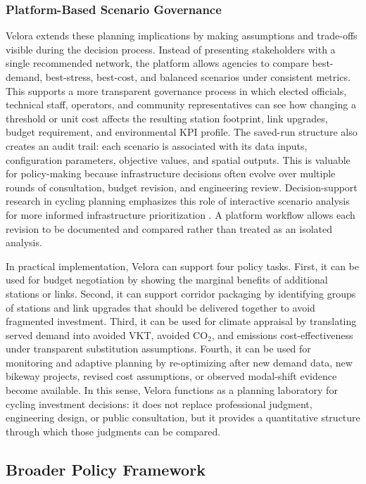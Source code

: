 \documentclass[preprint,authoryear,10pt]{elsarticle}
\begin{document}
\subsubsection{Platform-Based Scenario Governance}

Velora extends these planning implications by making assumptions and trade-offs visible during the decision process. Instead of presenting stakeholders with a single recommended network, the platform allows agencies to compare best-demand, best-stress, best-cost, and balanced scenarios under consistent metrics. This supports a more transparent governance process in which elected officials, technical staff, operators, and community representatives can see how changing a threshold or unit cost affects the resulting station footprint, link upgrades, budget requirement, and environmental KPI profile. The saved-run structure also creates an audit trail: each scenario is associated with its data inputs, configuration parameters, objective values, and spatial outputs. This is valuable for policy-making because infrastructure decisions often evolve over multiple rounds of consultation, budget revision, and engineering review. Decision-support research in cycling planning emphasizes this role of interactive scenario analysis for more informed infrastructure prioritization \citep{silvestriCyclabilityDSS2024}. A platform workflow allows each revision to be documented and compared rather than treated as an isolated analysis.

In practical implementation, Velora can support four policy tasks. First, it can be used for budget negotiation by showing the marginal benefits of additional stations or links. Second, it can support corridor packaging by identifying groups of stations and link upgrades that should be delivered together to avoid fragmented investment. Third, it can be used for climate appraisal by translating served demand into avoided VKT, avoided CO$_2$, and emissions cost-effectiveness under transparent substitution assumptions. Fourth, it can be used for monitoring and adaptive planning by re-optimizing after new demand data, new bikeway projects, revised cost assumptions, or observed modal-shift evidence become available. In this sense, Velora functions as a planning laboratory for cycling investment decisions: it does not replace professional judgment, engineering design, or public consultation, but it provides a quantitative structure through which those judgments can be compared.

\subsection{Broader Policy Framework}
\end{document}
